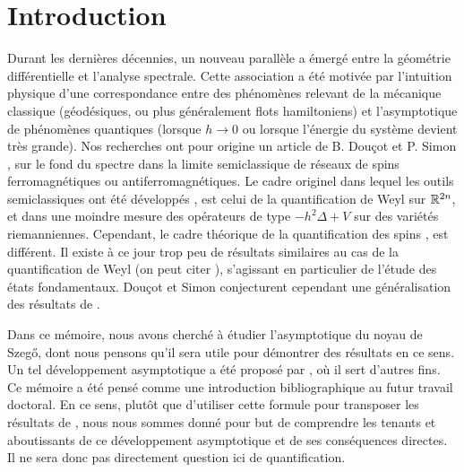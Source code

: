 \chapter*{Introduction}
Durant les dernières décennies, un nouveau parallèle a émergé entre la géométrie différentielle et l'analyse spectrale. Cette association a été motivée par l'intuition physique d'une correspondance entre des phénomènes relevant de la mécanique classique (géodésiques, ou plus généralement flots hamiltoniens) et l'asymptotique de phénomènes quantiques (lorsque $h \to 0$ ou lorsque l'énergie du système devient très grande). Nos recherches ont pour origine un article de B. Douçot et P. Simon \cite{douccot1998semiclassical}, sur le fond du spectre dans la limite semiclassique de réseaux de spins ferromagnétiques ou antiferromagnétiques. Le cadre originel dans lequel les outils semiclassiques ont été développés \cite{helffer1988semi},  \cite{zworski2012semiclassical} est celui de la quantification de Weyl sur $\mathbb{R}^{2n}$, et dans une moindre mesure des opérateurs de type $-h^2\Delta + V$ sur des variétés riemanniennes. Cependant, le cadre théorique de la quantification des spins \cite{ma2012berezin}, \cite{borthwick2000introduction} est différent. Il existe à ce jour trop peu de résultats similaires au cas de la quantification de Weyl (on peut citer \cite{borthwick1998semiclassical}), s'agissant en particulier de l'étude des états fondamentaux. Douçot et Simon conjecturent cependant une généralisation des résultats de \cite{helffer1988semi}. 

Dans ce mémoire, nous avons cherché à étudier l'asymptotique du noyau de Szeg\H{o}, dont nous pensons qu'il sera utile pour démontrer des résultats en ce sens. Un tel développement asymptotique a été proposé par \cite{Shiffman2002}, où il sert d'autres fins. Ce mémoire a été pensé comme une introduction bibliographique au futur travail doctoral. En ce sens, plutôt que d'utiliser cette formule pour transposer les résultats de \cite{helffer1988semi}, nous nous sommes donné pour but de comprendre les tenants et aboutissants de ce développement asymptotique et de ses conséquences directes. Il ne sera donc pas directement question ici de quantification.

